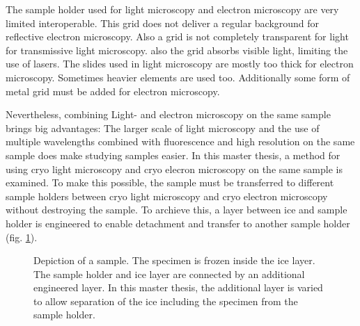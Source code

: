 The sample holder used for light microscopy and electron microscopy are very limited interoperable. This grid does not deliver a regular background for reflective electron microscopy. Also a grid is not completely transparent for light for transmissive light microscopy. also the grid absorbs visible light, limiting the use of lasers. The slides used in light microscopy are mostly too thick for electron microscopy. Sometimes heavier elements are used too. Additionally some form of metal grid must be added for electron microscopy. 


Nevertheless, combining Light- and electron microscopy on the same sample brings big advantages: The larger scale of light microscopy and the use of multiple wavelengths combined with fluorescence and high resolution on the same sample does make studying samples easier. In this master thesis, a method for using cryo light microscopy and cryo elecron microscopy on the same sample is examined. To make this possible, the sample must be transferred to different sample holders between cryo light microscopy and cryo electron microscopy without destroying the sample. To archieve this, a layer between  ice and sample holder is engineered to enable detachment and transfer to another sample holder (fig. \ref{fig:layersingeneral}).

\begin{figure}[hbt!]
	\centering
	
	\caption{Depiction of a sample. The specimen is frozen inside the ice layer. The sample holder and ice layer are connected by an additional engineered layer. In this master thesis, the additional layer is varied to allow separation of the ice including the specimen from the sample holder.}
	\label{fig:layersingeneral}
\end{figure}


